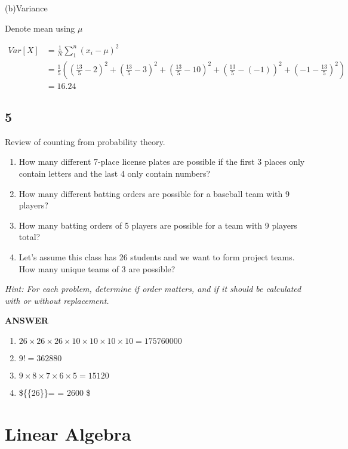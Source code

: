 \documentclass[11pt]{article}
\begin{document}
(b)Variance

Denote mean using \(\mu\)

\[
\begin{align}
Var[X] &= \frac{1}{N}\sum_{1}^{n}(x_{i}-\mu)^2 \\
       &= \frac{1}{5}((\frac{13}{5}-2)^2+(\frac{13}{5}-3)^2+(\frac{13}{5}-10)^2+(\frac{13}{5}-(-1))^2+(-1-\frac{13}{5})^2) \\
       &=16.24
\end{align}
\]

    \subsection{5}\label{section}

Review of counting from probability theory.

\begin{enumerate}
\def\labelenumi{(\alph{enumi})}
\item
  How many different 7-place license plates are possible if the first 3
  places only contain letters and the last 4 only contain numbers?
\item
  How many different batting orders are possible for a baseball team
  with 9 players?
\item
  How many batting orders of 5 players are possible for a team with 9
  players total?
\item
  Let's assume this class has 26 students and we want to form project
  teams. How many unique teams of 3 are possible?
\end{enumerate}

\emph{Hint: For each problem, determine if order matters, and if it
should be calculated with or without replacement.}

    \textbf{ANSWER}

\begin{enumerate}
\def\labelenumi{(\alph{enumi})}
\item
  \(26\times26\times26\times10\times10\times10\times10=175760000\)
\item
  \(9!=362880\)
\item
  \(9\times8\times7\times6\times5=15120\)
\item
  \$\{\{26\}\}=  = 2600 \$
\end{enumerate}

    \section{Linear Algebra}\label{linear-algebra}
\end{document}
